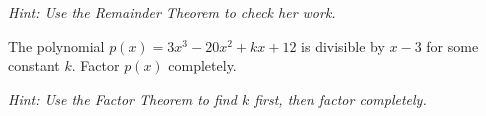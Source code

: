 \documentclass[12pt]{exam}
\begin{document}
\begin{questions}
\textit{Hint: Use the Remainder Theorem to check her work.}
\vspace*{4cm}

\newpage

\question[8]
The polynomial $p(x) = 3x^3 - 20x^2 + kx + 12$ is divisible by $x - 3$ for some constant $k$. Factor $p(x)$ completely.

\textit{Hint: Use the Factor Theorem to find $k$ first, then factor completely.}
\vspace*{5cm}

\end{questions}
\end{document}
